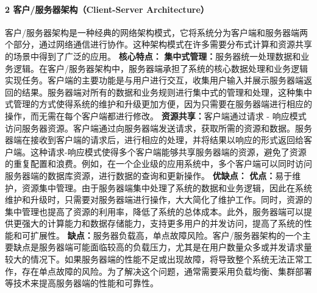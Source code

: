 \paragraph{2 客户/服务器架构（Client-Server
Architecture）}\label{ux5ba2ux6237ux670dux52a1ux5668ux67b6ux6784client-server-architecture}
客户/服务器架构是一种经典的网络架构模式，它将系统分为客户端和服务器端两个部分，通过网络通信进行协作。这种架构模式在许多需要分布式计算和资源共享的场景中得到了广泛的应用。 \textbf{核心特点：}
\textbf{集中式管理：}服务器统一处理数据和业务逻辑。在客户/服务器架构中，服务器端承担了系统的核心数据处理和业务逻辑实现任务。客户端的主要功能是与用户进行交互，收集用户输入并展示服务器端返回的结果。服务器端对所有的数据和业务规则进行集中式的管理和处理，这种集中式管理的方式使得系统的维护和升级更加方便，因为只需要在服务器端进行相应的操作，而无需在每个客户端都进行修改。
\textbf{资源共享：}客户端通过请求 -
响应模式访问服务器资源。客户端通过向服务器端发送请求，获取所需的资源和数据。服务器端在接收到客户端的请求后，进行相应的处理，并将结果以响应的形式返回给客户端。这种请求-响应模式使得多个客户端能够共享服务器端的资源，避免了资源的重复配置和浪费。例如，在一个企业级的应用系统中，多个客户端可以同时访问服务器端的数据库资源，进行数据的查询和更新操作。
\textbf{优缺点：}
\textbf{优点：}易于维护，资源集中管理。由于服务器端集中处理了系统的数据和业务逻辑，因此在系统维护和升级时，只需要对服务器端进行操作，大大简化了维护工作。同时，资源的集中管理也提高了资源的利用率，降低了系统的总体成本。此外，服务器端可以提供更强大的计算能力和数据存储能力，支持更多用户的并发访问，提高了系统的性能和可扩展性。
\textbf{缺点：}服务器负载高，单点故障风险。客户/服务器架构的一个主要缺点是服务器端可能面临较高的负载压力，尤其是在用户数量众多或并发请求量较大的情况下。如果服务器端的性能不足或出现故障，将导致整个系统无法正常工作，存在单点故障的风险。为了解决这个问题，通常需要采用负载均衡、集群部署等技术来提高服务器端的性能和可靠性。
